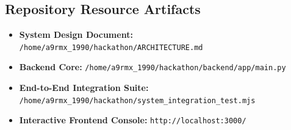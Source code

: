 \documentclass[11pt,a4paper]{article}
\begin{document}
\subsection*{Repository Resource Artifacts}
\begin{itemize}[leftmargin=1.8em, itemsep=2pt]
    \item \textbf{System Design Document:} \texttt{/home/a9rmx\_1990/hackathon/ARCHITECTURE.md}
    \item \textbf{Backend Core:} \texttt{/home/a9rmx\_1990/hackathon/backend/app/main.py}
    \item \textbf{End-to-End Integration Suite:} \texttt{/home/a9rmx\_1990/hackathon/system\_integration\_test.mjs}
    \item \textbf{Interactive Frontend Console:} \texttt{http://localhost:3000/}
\end{itemize}
\end{document}
